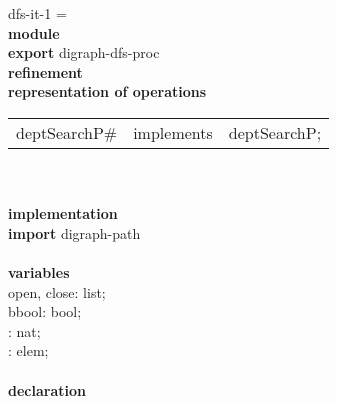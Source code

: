 \begin{tabbing}\label{dfs-it-1-module}%
dfs-it-1 = \\
{\bf mod}\={\bf ule}\+\\
{\bf export} digraph-dfs-proc\\
{\bf ref}\={\bf inement}\+\\
{\bf rep}\= {\bf resentation of operations}\+\\
\begin{tabular}{lcl}
deptSearchP\# & implements & deptSearchP;
\end{tabular}\-\\

\\
{\bf implementation}\\
{\bf import} digraph-path\\
\\
{\bf vari}\={\bf ables}\+\\
open, close: list;\\
bbool: bool;\\
: nat;\\
: elem;
\-\\
\\

               {\bf declaration}
\end{tabbing}

